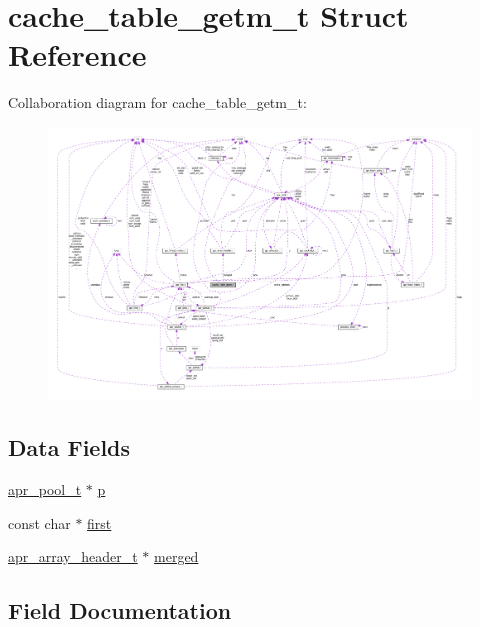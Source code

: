 \hypertarget{structcache__table__getm__t}{}\section{cache\+\_\+table\+\_\+getm\+\_\+t Struct Reference}
\label{structcache__table__getm__t}


Collaboration diagram for cache\+\_\+table\+\_\+getm\+\_\+t\+:
\nopagebreak
\begin{figure}[H]
\begin{center}
\leavevmode
\includegraphics[width=350pt]{structcache__table__getm__t__coll__graph}
\end{center}
\end{figure}
\subsection*{Data Fields}
\begin{DoxyCompactItemize}
\item 
\hyperlink{structapr__pool__t}{apr\+\_\+pool\+\_\+t} $\ast$ \hyperlink{structcache__table__getm__t_aef53ee2fbdd18ae818995ca2d0367c8f}{p}
\item 
const char $\ast$ \hyperlink{structcache__table__getm__t_a32828dd02e32454edba8b5b0c82cefed}{first}
\item 
\hyperlink{structapr__array__header__t}{apr\+\_\+array\+\_\+header\+\_\+t} $\ast$ \hyperlink{structcache__table__getm__t_a87987bba6b631eccdcb7dfa3dbf556b5}{merged}
\end{DoxyCompactItemize}


\subsection{Field Documentation}
